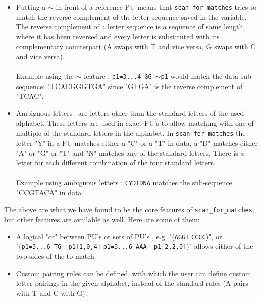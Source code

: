 \documentclass[12pt]{article}
\newcommand{\scm}{\texttt{scan\_for\_matches} }
\newcommand{\pu}{PU }
\newcommand{\pus}{PU's }
\begin{document}
\begin{itemize}
Example using single-letter edits : \texttt{p1=12...15\; ATTCC[1,0,3]\; p1[2,2,2]} 
where the exact \pu is allowed 1 mismatch, 0
deletions and 3 insertions and the reference \pu is allowed 2 of each.
\item Putting a $\sim$ in front of a reference \pu means that \scm tries to match the reverse 
complement of the letter-sequence saved in the variable. 
The reverse complement of a letter sequence is a sequence of same length, where it has been reversed and every letter
is substituted with its complementary counterpart (A swaps with T and vice versa, G swaps with C and vice versa).\\ \\
Example using the $\sim$ feature : \texttt{p1=3...4\; GG\; $\sim$p1} would match the data sub-sequence:
"TCACGGGTGA" since "GTGA" is the reverse complement of "TCAC".
\item Ambiguous letters~\cite{ambi} are letters other than the standard letters of the used alphabet. These letters are used
in exact \pus to allow matching with one of multiple of the standard letters in the alphabet.
In \scm the letter "Y" in a \pu matches either a "C" or a "T" in data, a "D" matches either "A" or "G" or "T" 
and "N" matches any of the standard letters. There is a letter for each different combination of the
four standard letters. \\ \\
Example using ambiguous letters : \texttt{CYDTDNA} matches the sub-sequence "CCGTACA" in data.
\end{itemize}
The above are what we have found to be the core features of \texttt{scan\_for\_matches}, 
but other features are available as well. Here are some of them: 
\begin{itemize}
\item A logical "or" between \pus or sets of \pus, e.g. "(\texttt{AGGT} \text{\textbar} \texttt{CCCC})", or  \\
"(\texttt{p1=3...6 TG ~p1[1,0,4]} \text{\textbar} \texttt{p1=3...6 AAA ~p1[2,2,0]})"
allows either of the two sides of the \text{\textbar} to match.
\item Custom pairing rules can be defined, with which the user can define custom letter pairings in the given
alphabet, instead of the standard rules (A pairs with T and C with G).
\end{itemize}
\end{document}
